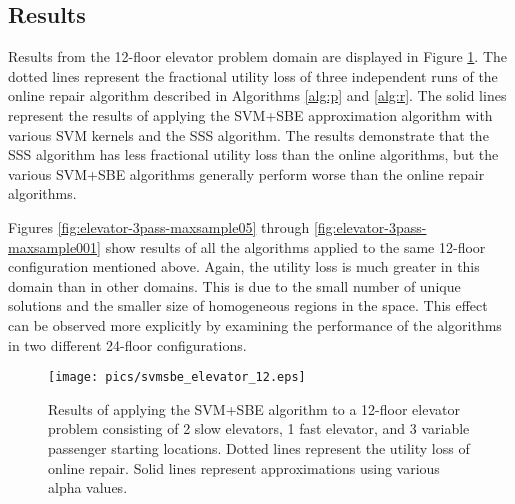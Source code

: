 

\subsection{Results}

Results from the 12-floor elevator problem domain are displayed in Figure \ref{fig:svmsbe_elevator_12}.  The dotted lines represent the fractional utility loss of three independent runs of the online repair algorithm described in Algorithms \ref{alg:p} and \ref{alg:r}.  The solid lines represent the results of applying the SVM+SBE approximation algorithm with various SVM kernels and the SSS algorithm.  The results demonstrate that the SSS algorithm has less fractional utility loss than the online algorithms, but the various SVM+SBE algorithms generally perform worse than the online repair algorithms.


Figures \ref{fig:elevator-3pass-maxsample05} through \ref{fig:elevator-3pass-maxsample001} show results of all the algorithms applied to the same 12-floor configuration mentioned above.  Again, the utility loss is much greater in this domain than in other domains.  This is due to the small number of unique solutions and the smaller size of homogeneous regions in the space.  This effect can be observed more explicitly by examining the performance of the algorithms in two different 24-floor configurations.  


\begin{figure}
\begin{center}
\texttt{[image: pics/svmsbe\_elevator\_12.eps]}
\caption{Results of applying the SVM+SBE algorithm to a 12-floor elevator problem consisting of 2 slow elevators, 1 fast elevator, and 3 variable passenger starting locations.  Dotted lines represent the utility loss of online repair.  Solid lines represent approximations using various alpha values.}
\label{fig:svmsbe_elevator_12}
\end{center}
\end{figure}




